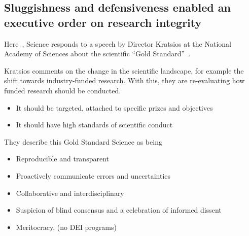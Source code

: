 \documentclass[../../main/main.tex]{subfiles}
\begin{document}
\subsection*{Sluggishness and defensiveness enabled an executive order on research integrity}

Here~\cite{thorp25-06}, Science responds to a speech by Director Kratsios at the National Academy of Sciences about the scientific ``Gold Standard''~\cite{kratsios25-05}.

Kratsios comments on the change in the scientific landscape, for example the shift towards industry-funded research.
With this, they are re-evaluating how funded research should be conducted.
\begin{itemize}
    \item It should be targeted, attached to specific prizes and objectives
    \item It should have high standards of scientific conduct
\end{itemize}
They describe this Gold Standard Science as being
\begin{itemize}
    \item Reproducible and transparent
    \item Proactively communicate errors and uncertainties
    \item Collaborative and interdisciplinary
    \item Suspicion of blind consensus and a celebration of informed dissent
    \item Meritocracy, (no DEI programs)
\end{itemize}

\bibsub
\end{document}
